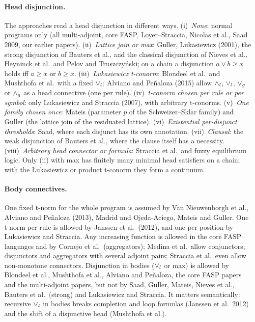 \paragraph{Head disjunction.}
The approaches read a head disjunction in different ways.
(i)~\emph{None}: normal programs only (all multi-adjoint, core FASP, Loyer--Straccia, Nicolas et al., Saad 2009, our earlier papers).
(ii)~\emph{Lattice join or max}: Guller, Lukasiewicz (2001), the strong disjunction of Bauters et al., and the classical disjunction of Nieves et al., Heyninck et al.\ and Pelov and Truszczy\'nski; on a chain a disjunction $a\lor b\geq x$ holds iff $a\geq x$ or $b\geq x$.
(iii)~\emph{Łukasiewicz t-conorm}: Blondeel et al.\ and Mushthofa et al.\ with a fixed $\lor_l$; Alviano and Pe\~naloza (2015) allow $\land_l$, $\lor_l$, $\lor_g$ or $\land_g$ as a head connective (one per rule).
(iv)~\emph{t-conorm chosen per rule or per symbol}: only Lukasiewicz and Straccia (2007), with arbitrary t-conorms.
(v)~\emph{One family chosen once}: Mateis (parameter $p$ of the Schweizer--Sklar family) and Guller (the lattice join of the residuated lattice).
(vi)~\emph{Existential per-disjunct thresholds}: Saad, where each disjunct has its own annotation.
(vii)~\emph{Clausal}: the weak disjunction of Bauters et al., where the clause itself has a necessity.
(viii)~\emph{Arbitrary head connector or formula}: Straccia et al.\ and fuzzy equilibrium logic.
Only (ii) with max has finitely many minimal head satisfiers on a chain; with the Łukasiewicz or product t-conorm they form a continuum.

\paragraph{Body connectives.}
One fixed t-norm for the whole program is assumed by Van Nieuwenborgh et al., Alviano and Pe\~naloza (2013), Madrid and Ojeda-Aciego, Mateis and Guller.
One t-norm per rule is allowed by Janssen et al.\ (2012), and one per position by Lukasiewicz and Straccia.
Any increasing function is allowed in the core FASP languages and by Cornejo et al.\ (aggregators); Medina et al.\ allow conjunctors, disjunctors and aggregators with several adjoint pairs; Straccia et al.\ even allow non-monotone connectors.
Disjunction in bodies ($\lor_l$ or max) is allowed by Blondeel et al., Mushthofa et al., Alviano and Pe\~naloza, the core FASP papers and the multi-adjoint papers, but not by Saad, Guller, Mateis, Nieves et al., Bauters et al.\ (strong) and Lukasiewicz and Straccia.
It matters semantically: recursive $\lor_l$ in bodies breaks completion and loop formulas (Janssen et al.~2012) and the shift of a disjunctive head (Mushthofa et al.).

